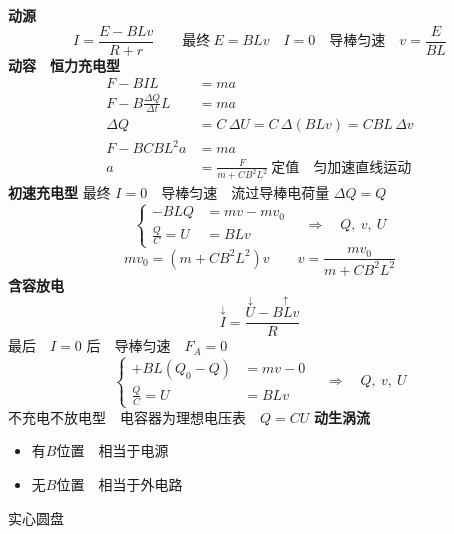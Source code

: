 \textbf{动源}
\[
I=\frac{E-BLv}{R+r}\qquad\text{最终}\ E=BLv\quad I=0\quad\text{导棒匀速}\quad v=\frac{E}{BL}
\]
\textbf{动容}　\textbf{恒力充电型}
\begin{align*}
F-BIL&=ma\\
F-B\frac{\Delta Q}{\Delta t}L&=ma\\
\Delta Q&=C\,\Delta U=C\,\Delta(BLv)=CBL\,\Delta v\\
F-BCBL^{2}a&=ma\\
a&=\frac{F}{m+CB^2L^2}\ \text{定值}\quad\text{匀加速直线运动}
\end{align*}
\textbf{初速充电型}
最终 $I=0$　导棒匀速　流过导棒电荷量 $\Delta Q=Q$
\[
\left\{\begin{aligned}
-BLQ&=mv-mv_0\\
\frac{Q}{C}=U&=BLv
\end{aligned}\right.
\quad\Rightarrow\quad Q,\ v,\ U
\]
\[
mv_0=(m+CB^2L^2)v\qquad v=\frac{mv_0}{m+CB^2L^2}
\]
\textbf{含容放电}
\[
\overset{\downarrow}{I}=\frac{\overset{\downarrow}{U}-\overset{\uparrow}{BLv}}{R}
\]
最后　$I=0$ 后　导棒匀速　$F_A=0$
\[
\left\{\begin{aligned}
+BL(Q_0-Q)&=mv-0\\
\frac{Q}{C}=U&=BLv
\end{aligned}\right.
\quad\Rightarrow\quad Q,\ v,\ U
\]
不充电不放电型　电容器为理想电压表　$Q=CU$
\textbf{动生涡流}
\begin{itemize}
  \item 有$B$位置　相当于电源
  \item 无$B$位置　相当于外电路
\end{itemize}
实心圆盘

